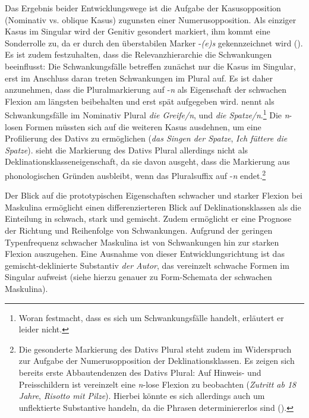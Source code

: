 Das Ergebnis beider Entwicklungswege ist die Aufgabe der Kasusopposition (Nominativ vs. oblique Kasus) zugunsten einer Numerusopposition. Als einziger Kasus im Singular wird der Genitiv gesondert markiert, ihm kommt eine Sonderrolle zu, da er durch den überstabilen Marker -\textit{(e)s} gekennzeichnet wird (\cite[140]{Wurzel.1984}). Es ist zudem festzuhalten, dass die Relevanzhierarchie die Schwankungen beeinflusst: Die Schwankungsfälle betreffen zunächst nur die Kasus im Singular, erst im Anschluss daran treten Schwankungen im Plural auf. Es ist daher anzunehmen, dass die Pluralmarkierung auf -\textit{n} als Eigenschaft der schwachen Flexion am längsten beibehalten und erst spät aufgegeben wird. \textcite[138]{Kopcke.1993} nennt als Schwankungsfälle im Nominativ Plural \textit{die Greife/n}, und \textit{die Spatze/n}.\footnote{Woran \textcite[138]{Kopcke.1993} festmacht, dass es sich um Schwankungsfälle handelt, erläutert er leider nicht.} Die \textit{n}-losen Formen müssten sich auf die weiteren Kasus ausdehnen, um eine Profilierung des Dativs zu ermöglichen (\textit{das Singen der Spatze}, \textit{Ich füttere die Spatze}). \textcite[283]{Nubling.2008} sieht die Markierung des Dativs Plural allerdings nicht als Deklinationsklasseneigenschaft, da sie davon ausgeht, dass die Markierung aus phonologischen Gründen ausbleibt, wenn das Pluralsuffix auf -\textit{n} endet.\footnote{Die gesonderte Markierung des Dativs Plural steht zudem im Widerspruch zur Aufgabe der Numerus\-opposition der Deklinationsklassen. Es zeigen sich bereits erste Abbautendenzen des Dativs Plural: Auf Hinweis- und Preisschildern ist vereinzelt eine \textit{n}-lose Flexion zu beobachten (\textit{Zutritt ab 18 Jahre}, \textit{Risotto mit Pilze}). Hierbei könnte es sich allerdings auch um unflektierte Substantive handeln, da die Phrasen determiniererlos sind (\cite[71--72]{Agel.2008}).}\largerpage

Der Blick auf die prototypischen Eigenschaften schwacher und starker Flexion bei Maskulina ermöglicht einen differenzierteren Blick auf Deklinationsklassen als die Einteilung in schwach, stark und gemischt. Zudem ermöglicht er eine Prognose der Richtung und Reihenfolge von Schwankungen. Aufgrund der geringen Typenfrequenz schwacher Maskulina ist von Schwankungen hin zur starken Flexion auszugehen. Eine Ausnahme von dieser Entwicklungsrichtung ist das gemischt-deklinierte Substantiv \textit{der Autor}, das vereinzelt schwache Formen im Singular aufweist (siehe hierzu genauer  zu Form-Schemata der schwachen Maskulina).


